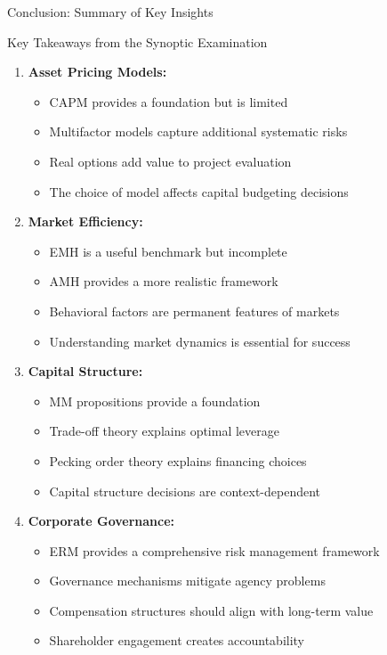 \documentclass[aspectratio=169]{beamer}
\begin{document}
	\begin{frame}{Conclusion: Summary of Key Insights}
		\begin{block}{Key Takeaways from the Synoptic Examination}
			
			\begin{enumerate}
				\item \textbf{Asset Pricing Models:}
				\begin{itemize}
					\item CAPM provides a foundation but is limited
					\item Multifactor models capture additional systematic risks
					\item Real options add value to project evaluation
					\item The choice of model affects capital budgeting decisions
				\end{itemize}
				
				\item \textbf{Market Efficiency:}
				\begin{itemize}
					\item EMH is a useful benchmark but incomplete
					\item AMH provides a more realistic framework
					\item Behavioral factors are permanent features of markets
					\item Understanding market dynamics is essential for success
				\end{itemize}
				
				\item \textbf{Capital Structure:}
				\begin{itemize}
					\item MM propositions provide a foundation
					\item Trade-off theory explains optimal leverage
					\item Pecking order theory explains financing choices
					\item Capital structure decisions are context-dependent
				\end{itemize}
				
				\item \textbf{Corporate Governance:}
				\begin{itemize}
					\item ERM provides a comprehensive risk management framework
					\item Governance mechanisms mitigate agency problems
					\item Compensation structures should align with long-term value
					\item Shareholder engagement creates accountability
				\end{itemize}
				

\end{enumerate}
\end{block}
\end{frame}
\end{document}
